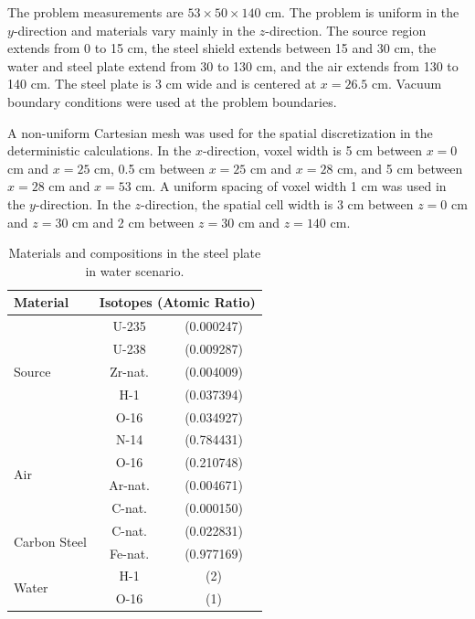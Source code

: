 \documentclass{article} %
\begin{document}
The problem measurements are $53\times50\times140$ cm. The problem is uniform 
in the $y$-direction and materials vary mainly in the $z$-direction. The source
region extends from 0 to 15 cm, the steel shield extends between 15 and 30 cm, 
the water and steel plate extend from 30 to 130 cm, and the air extends from 
130 to 140 cm. The steel plate is 3 cm wide and is centered at $x = 26.5$ cm. 
Vacuum boundary conditions were used at the problem boundaries.

A non-uniform Cartesian mesh was used for the spatial discretization in the 
deterministic calculations. In the $x$-direction, voxel width is 5 cm between
$x = 0$ cm and $x = 25$ cm, 0.5 cm between $x = 25$ cm and $x = 28$ cm, and 5 
cm between $x = 28$ cm and $x = 53$ cm. A uniform spacing of voxel width 1 cm 
was used in the $y$-direction. In the $z$-direction, the spatial cell width is
3 cm between $z = 0$ cm and $z = 30$ cm and 2 cm between $z = 30$ cm and 
$z = 140$ cm.

\begin{table}[!htb]
\centering
\caption{Materials and compositions in the steel plate in water scenario.}
\label{steel-mat}
\begin{tabular}{l|cc}
\textbf{Material} & \multicolumn{2}{c}{\textbf{Isotopes (Atomic Ratio)}} \\ \hline
\multirow{5}{*}{Source}   & U-235   & (0.000247) \\
                          & U-238   & (0.009287) \\
                          & Zr-nat. & (0.004009) \\
                          & H-1     & (0.037394) \\
                          & O-16    & (0.034927) \\ \hline
\multirow{4}{*}{Air}      & N-14    & (0.784431) \\
                          & O-16    & (0.210748) \\
                          & Ar-nat. & (0.004671) \\
                          & C-nat.  & (0.000150) \\ \hline
\multirow{2}{*}{Carbon Steel} & C-nat.  & (0.022831) \\
                              & Fe-nat. & (0.977169) \\ \hline
\multirow{2}{*}{Water}        & H-1     & (2)        \\
                              & O-16    & (1)        \\
\end{tabular}
\end{table}
\end{document}
